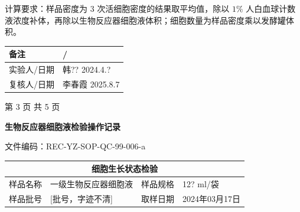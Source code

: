 \documentclass[UTF8,10pt,a4paper,fontset=fandol]{ctexart}
\newcommand{\fieldvalue}[1]{#1}
\newcommand{\handwritten}[1]{#1}
\begin{document}
\noindent
计算要求：样品密度为 $3$ 次活细胞密度的结果取平均值，除以 $1\%$ 人白血球计数液浓度补体，再除以生物反应器细胞液体积；细胞数量为样品密度乘以发酵罐体积。

\begin{tabularx}{\textwidth}{|p{}|X|}
\hline
备注 &
\fieldvalue{\handwritten{/}} \\
\hline
实验人/日期 &
\fieldvalue{\handwritten{韩??}}\quad
\fieldvalue{\handwritten{2024.4.?}} \\
\hline
复核人/日期 &
\fieldvalue{\handwritten{李春霞}}\quad
\fieldvalue{\handwritten{2025.8.7}} \\
\hline
\end{tabularx}

\begin{center}
第 3 页 共 5 页
\end{center}

\newpage

\begin{center}
\textbf{生物反应器细胞液检验操作记录}
\end{center}

\noindent
文件编码：REC-YZ-SOP-QC-99-006-a

\begin{center}
\begin{tabularx}{\textwidth}{|p{2.5cm}|X|p{2.5cm}|X|}
\hline
\multicolumn{4}{|c|}{细胞生长状态检验}\\
\hline
样品名称 &
\fieldvalue{一级生物反应器细胞液} &
样品规格 &
\fieldvalue{\handwritten{12? ml/袋}}\\
\hline
样品批号 &
\fieldvalue{\handwritten{[批号，字迹不清]}} &
取样日期 &
\fieldvalue{\handwritten{2024年03月17日}}\\
\hline
\end{tabularx}
\end{center}
\end{document}
